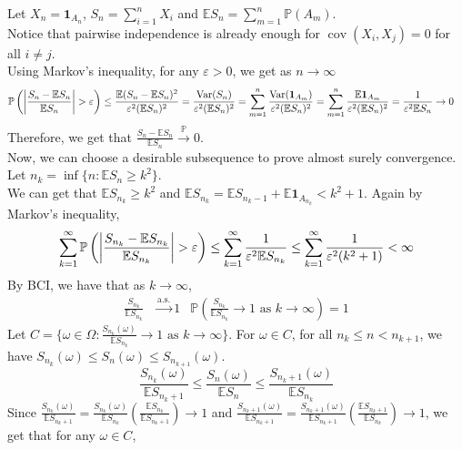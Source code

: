 \documentclass{huhtakm-template-book}
\newcommand{\prob}{\mathbb{P}}
\newcommand{\expect}{\mathbb{E}}
\DeclareMathOperator{\Var}{Var}
\DeclareMathOperator{\cov}{cov}
\begin{document}
\begin{proofing}
	Let $X_{n}=\mathbf{1}_{A_{n}}$, $S_{n}=\sum_{i=1}^{n}X_{i}$ and $\expect S_{n}=\sum_{m=1}^{n}\prob(A_{m})$.\\
	Notice that pairwise independence is already enough for $\cov(X_{i},X_{j})=0$ for all $i\neq j$.\\
	Using Markov's inequality, for any $\varepsilon>0$, we get as $n\to\infty$
	\begin{align*}
		\prob\left(\abs{\frac{S_{n}-\expect S_{n}}{\expect S_{n}}}>\varepsilon\right)&\leq\frac{\expect(S_{n}-\expect S_{n})^{2}}{\varepsilon^{2}(\expect S_{n})^{2}}=\frac{\Var(S_{n})}{\varepsilon^{2}(\expect S_{n})^{2}}=\sum_{m=1}^{n}\frac{\Var(\mathbf{1}_{A_{m}})}{\varepsilon^{2}(\expect S_{n})^{2}}=\sum_{m=1}^{n}\frac{\expect\mathbf{1}_{A_{m}}}{\varepsilon^{2}(\expect S_{n})^{2}}=\frac{1}{\varepsilon^{2}\expect S_{n}}\to 0
	\end{align*}
	Therefore, we get that $\frac{S_{n}-\expect S_{n}}{\expect S_{n}}\xrightarrow{\prob}0$.\\
	Now, we can choose a desirable subsequence to prove almost surely convergence. Let $n_{k}=\inf\{n:\expect S_{n}\geq k^{2}\}$.\\
	We can get that $\expect S_{n_{k}}\geq k^{2}$ and $\expect S_{n_{k}}=\expect S_{n_{k}-1}+\expect\mathbf{1}_{A_{n_{k}}}<k^{2}+1$. Again by Markov's inequality,
	\begin{equation*}
		\sum_{k=1}^{\infty}\prob\left(\abs{\frac{S_{n_{k}}-\expect S_{n_{k}}}{\expect S_{n_{k}}}}>\varepsilon\right)\leq\sum_{k=1}^{\infty}\frac{1}{\varepsilon^{2}\expect S_{n_{k}}}\leq\sum_{k=1}^{\infty}\frac{1}{\varepsilon^{2}(k^{2}+1)}<\infty
	\end{equation*}
	By BCI, we have that as $k\to\infty$,
	\begin{align*}
		\frac{S_{n_{k}}}{\expect S_{n_{k}}}&\xrightarrow{\text{a.s.}}1 & \prob\left(\frac{S_{n_{k}}}{\expect S_{n_{k}}}\to 1\text{ as }k\to\infty\right)=1
	\end{align*}
	Let $C=\{\omega\in\Omega:\frac{S_{n_{k}}(\omega)}{\expect S_{n_{k}}}\to 1\text{ as }k\to\infty\}$. For $\omega\in C$, for all $n_{k}\leq n<n_{k+1}$, we have $S_{n_{k}}(\omega)\leq S_{n}(\omega)\leq S_{n_{k+1}}(\omega)$.
	\begin{equation*}
		\frac{S_{n_{k}}(\omega)}{\expect S_{n_{k}+1}}\leq\frac{S_{n}(\omega)}{\expect S_{n}}\leq\frac{S_{n_{k}+1}(\omega)}{\expect S_{n_{k}}}
	\end{equation*}
	Since $\frac{S_{n_{k}}(\omega)}{\expect S_{n_{k}+1}}=\frac{S_{n_{k}}(\omega)}{\expect S_{n_{k}}}\left(\frac{\expect S_{n_{k}}}{\expect S_{n_{k}+1}}\right)\to 1$ and $\frac{S_{n_{k}+1}(\omega)}{\expect S_{n_{k}+1}}=\frac{S_{n_{k}+1}(\omega)}{\expect S_{n_{k}+1}}\left(\frac{\expect S_{n_{k}+1}}{\expect S_{n_{k}}}\right)\to 1$, we get that for any $\omega\in C$,

\end{proofing}
\end{document}
